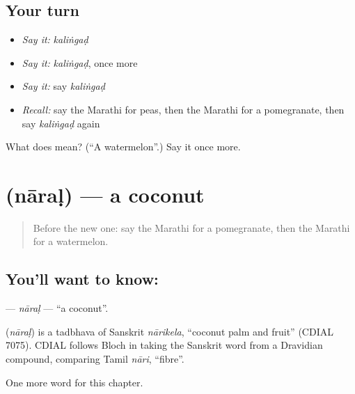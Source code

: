 \subsection*{Your turn}
\begin{itemize}
\raggedright
  \item \emph{Say it:} \emph{kaliṅgaḍ}
  \item \emph{Say it:} \emph{kaliṅgaḍ}, once more
  \item \emph{Say it:} say \emph{kaliṅgaḍ}
  \item \emph{Recall:} say the Marathi for peas, then the Marathi for a pomegranate, then say \emph{kaliṅgaḍ} again
\end{itemize}

\begin{tcolorbox}[breakable,colback=teal!4,colframe=teal!35!black,title={Before you move on}]
What does  mean? (\textquotedblleft{}A watermelon\textquotedblright{}.) Say it once more.
\end{tcolorbox}
\section[\texorpdfstring{\mr{नारळ} (nāraḷ)}{नारळ (nāraḷ)}]{ (nāraḷ) — a coconut}

\label{lesson:MR-C138-naral}



\begin{quote}
Before the new one: say the Marathi for a pomegranate, then the Marathi for a watermelon.
\end{quote}

\subsection*{You'll want to know: }
\textbf{} — \emph{nāraḷ} — \textquotedblleft{}a coconut\textquotedblright{}.

\begin{cousinweb}
\textbf{} (\emph{nāraḷ}) is a tadbhava of Sanskrit \emph{nārikela}, \textquotedblleft{}coconut palm and fruit\textquotedblright{} (CDIAL 7075). CDIAL follows Bloch in taking the Sanskrit word from a Dravidian compound, comparing Tamil \emph{nāri}, \textquotedblleft{}fibre\textquotedblright{}.
\end{cousinweb}

\begin{grammarlens}[title={What you've built}]
One more word for this chapter.
\end{grammarlens}

